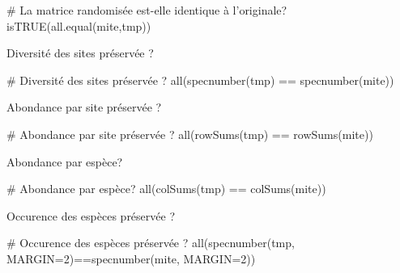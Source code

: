 \documentclass[]{article}
\newenvironment{Shaded}{\begin{snugshade}}{\end{snugshade}}
\newcommand{\KeywordTok}[1]{\textcolor[rgb]{0.94,0.87,0.69}{#1}}
\newcommand{\DataTypeTok}[1]{\textcolor[rgb]{0.87,0.87,0.75}{#1}}
\newcommand{\DecValTok}[1]{\textcolor[rgb]{0.86,0.86,0.80}{#1}}
\newcommand{\StringTok}[1]{\textcolor[rgb]{0.80,0.58,0.58}{#1}}
\newcommand{\CommentTok}[1]{\textcolor[rgb]{0.50,0.62,0.50}{#1}}
\newcommand{\OperatorTok}[1]{\textcolor[rgb]{0.94,0.94,0.82}{#1}}
\newcommand{\NormalTok}[1]{\textcolor[rgb]{0.80,0.80,0.80}{#1}}
\begin{document}
\begin{Shaded}
\begin{Highlighting}[]
\CommentTok{# La matrice randomisée est-elle identique à l'originale?}
\KeywordTok{isTRUE}\NormalTok{(}\KeywordTok{all.equal}\NormalTok{(mite,tmp))}
\end{Highlighting}
\end{Shaded}

Diversité des sites préservée ?

\begin{Shaded}
\begin{Highlighting}[]
\CommentTok{# Diversité des sites préservée ?}
\KeywordTok{all}\NormalTok{(}\KeywordTok{specnumber}\NormalTok{(tmp) }\OperatorTok{==}\StringTok{ }\KeywordTok{specnumber}\NormalTok{(mite))}
\end{Highlighting}
\end{Shaded}

Abondance par site préservée ?

\begin{Shaded}
\begin{Highlighting}[]
\CommentTok{# Abondance par site préservée ?}
\KeywordTok{all}\NormalTok{(}\KeywordTok{rowSums}\NormalTok{(tmp) }\OperatorTok{==}\StringTok{ }\KeywordTok{rowSums}\NormalTok{(mite))}
\end{Highlighting}
\end{Shaded}

Abondance par espèce?

\begin{Shaded}
\begin{Highlighting}[]
\CommentTok{# Abondance par espèce?}
\KeywordTok{all}\NormalTok{(}\KeywordTok{colSums}\NormalTok{(tmp) }\OperatorTok{==}\StringTok{ }\KeywordTok{colSums}\NormalTok{(mite))}
\end{Highlighting}
\end{Shaded}

Occurence des espèces préservée ?

\begin{Shaded}
\begin{Highlighting}[]
\CommentTok{# Occurence des espèces préservée ?}
\KeywordTok{all}\NormalTok{(}\KeywordTok{specnumber}\NormalTok{(tmp, }\DataTypeTok{MARGIN=}\DecValTok{2}\NormalTok{)}\OperatorTok{==}\KeywordTok{specnumber}\NormalTok{(mite, }\DataTypeTok{MARGIN=}\DecValTok{2}\NormalTok{))}
\end{Highlighting}
\end{Shaded}
\end{document}
